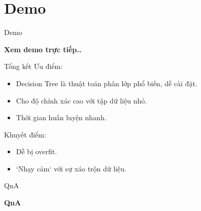 \documentclass[aspectratio=169,xcolor=dvipsnames]{beamer}
\begin{document}
\section{Demo}
\begin{frame}{Demo}
    \Huge{\centerline{\textbf{Xem demo trực tiếp..}}}
\end{frame}

\begin{frame}{Tổng kết}
Ưu điểm:
\begin{itemize}
\item Decision Tree là thuật toán phân lớp phổ biến, dễ cài đặt.
\item Cho độ chính xác cao với tập dữ liệu nhỏ.
\item Thời gian huấn luyện nhanh.
\end{itemize}
Khuyết điểm:
\begin{itemize}
\item Dễ bị overfit.
\item `Nhạy cảm` với sự xáo trộn dữ liệu.\cite{p1}
\end{itemize}
\end{frame}

\begin{frame}{QnA}
    \Huge{\centerline{\textbf{QnA}}}
\end{frame}



\end{document}
